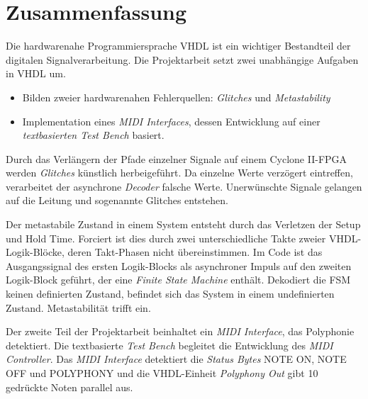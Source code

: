 
\chapter*{Zusammenfassung}


Die hardwarenahe Programmiersprache VHDL ist ein wichtiger Bestandteil der digitalen Signalverarbeitung. Die Projektarbeit setzt zwei unabhängige Aufgaben in VHDL um.

\begin{itemize}
\item Bilden zweier hardwarenahen Fehlerquellen: \textit{Glitches} und \textit{Metastability}
	\item Implementation eines \textit{MIDI Interfaces}, dessen Entwicklung auf einer \textit{textbasierten Test Bench} basiert.
\end{itemize} 

Durch das Verlängern der Pfade einzelner Signale auf einem Cyclone II-FPGA werden \textit{Glitches} künstlich herbeigeführt. Da einzelne Werte verzögert eintreffen, verarbeitet der asynchrone \textit{Decoder} falsche Werte. Unerwünschte Signale gelangen auf die Leitung und sogenannte Glitches entstehen. 

Der metastabile Zustand in einem System entsteht durch das Verletzen der Setup und Hold Time. Forciert ist dies durch zwei unterschiedliche Takte zweier VHDL-Logik-Blöcke, deren Takt-Phasen nicht übereinstimmen. Im Code ist das Ausgangssignal des ersten Logik-Blocks als asynchroner Impuls auf den zweiten Logik-Block geführt, der eine \textit{Finite State Machine} enthält. Dekodiert die FSM keinen definierten Zustand, befindet sich das System in einem undefinierten Zustand. Metastabilität trifft ein.

Der zweite Teil der Projektarbeit beinhaltet ein \textit{MIDI Interface}, das Polyphonie detektiert. Die textbasierte \textit{Test Bench} begleitet die Entwicklung des \textit{MIDI Controller}. Das \textit{MIDI Interface} detektiert die \textit{Status Bytes} NOTE ON, NOTE OFF und POLYPHONY und die VHDL-Einheit \textit{Polyphony Out} gibt 10 gedrückte Noten parallel aus.
